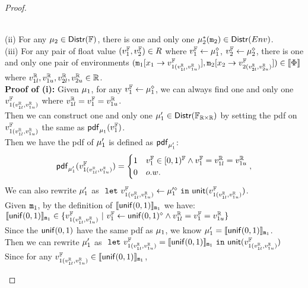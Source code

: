 \documentclass[a4paper,11pt]{article}
\begin{document}
\begin{proof}
\begin{itemize}
\begin{subproof}
	\\
	(ii) For any $\mu_2 \in \mathsf{Distr}(\mathbb{F})$, there is one and only one $\mu^*_2(\mathtt{m}_2) \in \mathsf{Distr}(Env)$.
	\\
	(iii) For any pair of float value $(v^{\mathbb{F}}_1, v^{\mathbb{F}}_2) \in R$ where 
	$v^{\mathbb{F}}_1 \leftarrow \mu_1^{\diamond}$, $v^{\mathbb{F}}_2 \leftarrow \mu_2^{\diamond}$,
	there is one and only one pair of environments 
	$(\mathtt{m}_1[ x_1 \to v^{\mathbb{F}}_{1(v^{\mathbb{R}}_{1l}, v^{\mathbb{R}}_{1u})}], \mathtt{m}_2[x_2 \to v^{\mathbb{F}}_{2(v^{\mathbb{R}}_{2l}, v^{\mathbb{R}}_{2u})}]) \in \llbracket \Phi \rrbracket$
	where $v^{\mathbb{R}}_{1l}, v^{\mathbb{R}}_{1u}, v^{\mathbb{R}}_{2l}, v^{\mathbb{R}}_{2u} \in \mathbb{R}$.
	\\ 
	\textbf{Proof of (i):} Given $\mu_1$, for any $v^{\mathbb{F}}_1 \leftarrow \mu_1^{\diamond}$, we can always find one and only one $v^{\mathbb{F}}_{1(v^{\mathbb{R}}_{1l}, v^{\mathbb{R}}_{1u})}$ where $v^{\mathbb{R}}_{1l} = v^{\mathbb{F}}_1 = v^{\mathbb{R}}_{1u}$.
	\\
	Then we can construct one and only one $\mu'_1 \in \mathsf{Distr}(\mathbb{F}_{\mathbb{R} \times \mathbb{R}})$
	by setting the pdf on $v^{\mathbb{F}}_{1(v^{\mathbb{R}}_{1l}, v^{\mathbb{R}}_{1u})}$ the same as $\mathsf{pdf}_{\mu_1}(v^{\mathbb{F}}_1)$. 
	\\
	Then we have the pdf of $\mu'_1$  
	is defined as $\mathsf{pdf}_{\mu'_1}$:
	\[
	\mathsf{pdf}_{\mu'_1}(v^{\mathbb{F}}_{1(v^{\mathbb{R}}_{1l}, v^{\mathbb{R}}_{1u})}) = 
		\begin{cases}
		1 & v^{\mathbb{F}}_1 \in [0, 1)^{\mathbb{F}}
		\land  v^{\mathbb{F}}_1 = v^{\mathbb{R}}_{1l} = v^{\mathbb{R}}_{1u}
		\\
		0       & o.w.
		\end{cases},
	\]
	We can also rewrite $\mu'_1$ as 
	$~\mathtt{let}~ v^{\mathbb{F}}_{1(v^{\mathbb{R}}_{1l}, v^{\mathbb{R}}_{1u})} \leftarrow \mu'^{\diamond}_1 
	~\mathtt{in}~ \mathsf{unit}(v^{\mathbb{F}}_{1(v^{\mathbb{R}}_{1l}, v^{\mathbb{R}}_{1u})})$.
	\\
	Given $\mathtt{m}_1$, by the definition of $\llbracket \mathsf{unif}(0, 1) \rrbracket_{\mathtt{m}_1}$ we have:
	\\
	$ \llbracket \mathsf{unif}(0, 1) \rrbracket_{\mathtt{m}_1} \in  
	\{v^{\mathbb{F}}_{1(v^{\mathbb{R}}_{1l}, v^{\mathbb{R}}_{1u})} 
	~|~ v^{\mathbb{F}}_1 \leftarrow \mathsf{unif}(0, 1)^{\diamond} 
	\land v^{\mathbb{R}}_{1l} = v^{\mathbb{F}}_1 = v^{\mathbb{R}}_{1u}\}$
	\\
	Since the $\mathsf{unif}(0, 1)$ have the same pdf as $\mu_1$, we know $\mu'_1 = \llbracket \mathsf{unif}(0, 1) \rrbracket_{\mathtt{m}_1}$.
	\\
	Then we can rewrite $\mu'_1$ as 
	$~\mathtt{let}~ v^{\mathbb{F}}_{1(v^{\mathbb{R}}_{1l}, v^{\mathbb{R}}_{1u})} = \llbracket \mathsf{unif}(0, 1) \rrbracket_{\mathtt{m}_1} 
	~\mathtt{in}~ \mathsf{unit}(v^{\mathbb{F}}_{1(v^{\mathbb{R}}_{1l}, v^{\mathbb{R}}_{1u})})$
	\\
	Since for any $v^{\mathbb{F}}_{1(v^{\mathbb{R}}_{1l}, v^{\mathbb{R}}_{1u})} \in \llbracket \mathsf{unif}(0, 1) \rrbracket_{\mathtt{m}_1}$, 

\end{subproof}
\end{itemize}
\end{proof}
\end{document}
